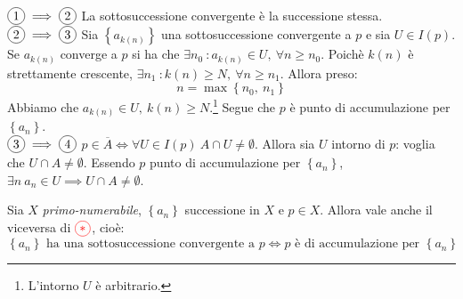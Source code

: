 \begin{demonstration}
$\circled{1}\implies\circled{2}$ La sottosuccessione convergente è la successione stessa.\\
$\circled{2}\implies\circled{3}$ Sia $\left\{a_{k\left(n\right)}\right\}$ una sottosuccessione convergente a $p$ e sia $U\in I\left(p\right)$. \\
Se $a_{k\left(n\right)}$ converge a $p$ si ha che $\exists n_0\ \colon a_{k\left(n\right)}\in U,\ \forall n\geq n_0$. Poichè $k\left(n\right)$ è strettamente crescente, $\exists n_1\ \colon k\left(n\right)\geq N,\ \forall n\geq n_1$. Allora preso:
\begin{equation*}
	n=\max\left\{n_0,\ n_1\right\}
\end{equation*}
Abbiamo che $a_{k\left(n\right)}\in U,\ k\left(n\right)\geq N$.\footnote{L'intorno $U$ è arbitrario.} Segue che $p$ è punto di accumulazione per $\left\{a_n\right\}$.\\
$\circled{3}\implies\circled{4}$ $p\in \overline{A}\iff \forall U\in I\left(p\right)\ A\cap U\neq \emptyset$. Allora sia $U$ intorno di $p$: voglia che $U\cap A\neq \emptyset$. Essendo $p$ punto di accumulazione per $\left\{a_n\right\}$, $\exists n\ a_n\in U\implies U\cap A\neq \emptyset$.
\end{demonstration}
\begin{lemming}\label{primonumesucc}
Sia $X$ \textit{primo-numerabile}, $\left\{a_n\right\}$ successione in $X$ e $p\in X$. Allora vale anche il viceversa di $\textcolor{red}{\circled{\ast}}$, cioè:
\begin{equation}
	\left\{a_n\right\}\text{ ha una sottosuccessione convergente a }p\iff p\text{ è di accumulazione per }\left\{a_n\right\}
\end{equation}
\end{lemming}

